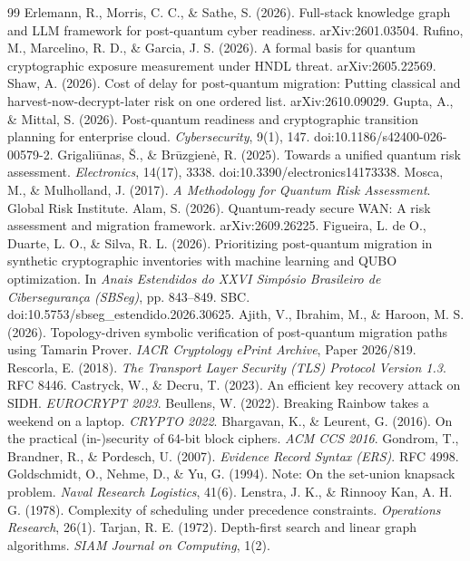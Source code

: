 \documentclass[conference]{IEEEtran}
\begin{document}
\begin{thebibliography}{99}
 Erlemann, R., Morris, C. C., \& Sathe, S. (2026). Full-stack knowledge graph and LLM framework for post-quantum cyber readiness. arXiv:2601.03504.
 Rufino, M., Marcelino, R. D., \& Garcia, J. S. (2026). A formal basis for quantum cryptographic exposure measurement under HNDL threat. arXiv:2605.22569.
 Shaw, A. (2026). Cost of delay for post-quantum migration: Putting classical and harvest-now-decrypt-later risk on one ordered list. arXiv:2610.09029.
 Gupta, A., \& Mittal, S. (2026). Post-quantum readiness and cryptographic transition planning for enterprise cloud. \emph{Cybersecurity}, 9(1), 147. doi:10.1186/s42400-026-00579-2.
 Grigaliūnas, Š., \& Brūzgienė, R. (2025). Towards a unified quantum risk assessment. \emph{Electronics}, 14(17), 3338. doi:10.3390/electronics14173338.
 Mosca, M., \& Mulholland, J. (2017). \emph{A Methodology for Quantum Risk Assessment}. Global Risk Institute.
 Alam, S. (2026). Quantum-ready secure WAN: A risk assessment and migration framework. arXiv:2609.26225.
 Figueira, L. de O., Duarte, L. O., \& Silva, R. L. (2026). Prioritizing post-quantum migration in synthetic cryptographic inventories with machine learning and QUBO optimization. In \emph{Anais Estendidos do XXVI Simpósio Brasileiro de Cibersegurança (SBSeg)}, pp. 843–849. SBC. doi:10.5753/sbseg\_estendido.2026.30625.
 Ajith, V., Ibrahim, M., \& Haroon, M. S. (2026). Topology-driven symbolic verification of post-quantum migration paths using Tamarin Prover. \emph{IACR Cryptology ePrint Archive}, Paper 2026/819.
 Rescorla, E. (2018). \emph{The Transport Layer Security (TLS) Protocol Version 1.3}. RFC 8446.
 Castryck, W., \& Decru, T. (2023). An efficient key recovery attack on SIDH. \emph{EUROCRYPT 2023}.
 Beullens, W. (2022). Breaking Rainbow takes a weekend on a laptop. \emph{CRYPTO 2022}.
 Bhargavan, K., \& Leurent, G. (2016). On the practical (in-)security of 64-bit block ciphers. \emph{ACM CCS 2016}.
 Gondrom, T., Brandner, R., \& Pordesch, U. (2007). \emph{Evidence Record Syntax (ERS)}. RFC 4998.
 Goldschmidt, O., Nehme, D., \& Yu, G. (1994). Note: On the set-union knapsack problem. \emph{Naval Research Logistics}, 41(6).
 Lenstra, J. K., \& Rinnooy Kan, A. H. G. (1978). Complexity of scheduling under precedence constraints. \emph{Operations Research}, 26(1).
 Tarjan, R. E. (1972). Depth-first search and linear graph algorithms. \emph{SIAM Journal on Computing}, 1(2).
\end{thebibliography}
\end{document}
